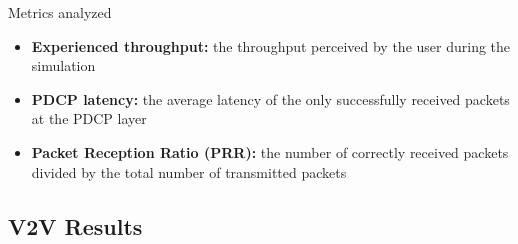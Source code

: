 \documentclass{beamer}
\begin{document}
	\begin{frame}{Metrics analyzed}
		\begin{itemize}
			\item \textbf{Experienced throughput: } the throughput perceived by the user during the simulation \vspace{.5em}
			\item \textbf{PDCP latency: } the average latency of the only successfully received packets at the PDCP layer\vspace{.5em}
			\item \textbf{Packet Reception Ratio (PRR): } the number of correctly received packets divided by the total number of transmitted packets
		\end{itemize}
	\end{frame}

	\subsection{V2V Results}

\end{document}
